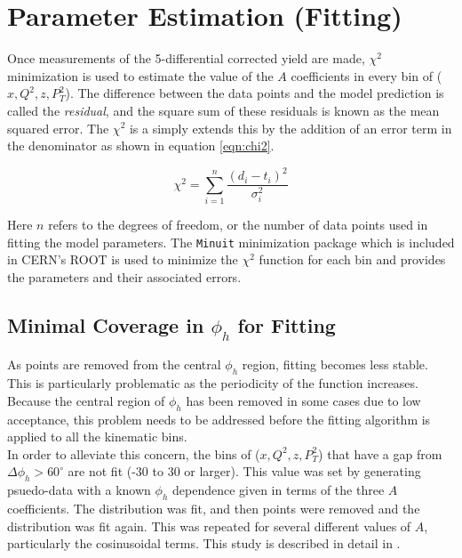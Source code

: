 \section{Parameter Estimation (Fitting)}
Once measurements of the 5-differential corrected yield are made, $\chi^2$ minimization is used to estimate the value of the $A$ coefficients in every bin of ($x, Q^2, z, P_T^2$).  The difference between the data points and the model prediction is called the \textit{residual}, and the square sum of these residuals is known as the mean squared error.  The $\chi^2$ is a simply extends this by the addition of an error term in the denominator as shown in equation \ref{eqn:chi2}.

\begin{equation}
	\chi^2 = \sum_{i = 1}^{n} \frac{(d_i - t_i)^2}{\sigma_i^2}
\end{equation}  

Here $n$ refers to the degrees of freedom, or the number of data points used in fitting the model parameters.  The \texttt{Minuit} minimization package which is included in CERN's ROOT is used to minimize the $\chi^2$ function for each bin and provides the parameters and their associated errors.

\subsection{Minimal Coverage in $\phi_h$ for Fitting}
As points are removed from the central $\phi_h$ region, fitting becomes less stable.  This is particularly problematic as the periodicity of the function increases.  Because the central region of $\phi_h$ has been removed in some cases due to low acceptance, this problem needs to be addressed before the fitting algorithm is applied to all the kinematic bins.  \\

In order to alleviate this concern, the bins of ($x, Q^2, z, P_T^2$) that have a gap from $\Delta \phi_h > 60^{\circ}$ are not fit (-30 to 30 or larger).  This value was set by generating psuedo-data with a known $\phi_h$ dependence given in terms of the three $A$ coefficients.  The distribution was fit, and then points were removed and the distribution was fit again.  This was repeated for several different values of $A$, particularly the cosinusoidal terms.  This study is described in detail in \cite{theses-harrison:2015}.

